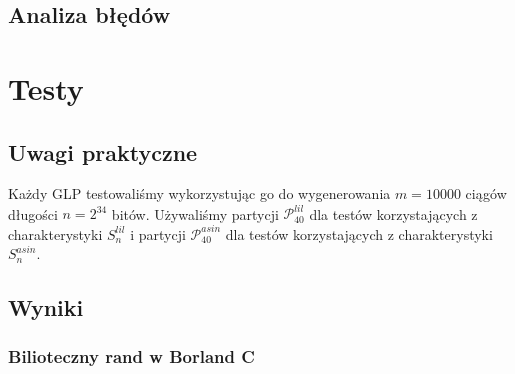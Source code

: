 \documentclass[a4paper,11pt,twoside]{book}
\newcommand{\Slil}[1]{S^{lil}_#1}
\newcommand{\Sasin}[1]{S^{asin}_#1}
\theoremstyle{definition}
\begin{document}
\section{Analiza błędów}


\chapter{Testy}
\label{czesc:testy}

\section{Uwagi praktyczne}

Każdy GLP testowaliśmy wykorzystując go do wygenerowania $m = 10000$ ciągów długości $n = 2^{34}$ bitów. Używaliśmy partycji $\mathcal{P}^{lil}_{40}$ dla testów korzystających z charakterystyki $\Slil{n}$ i partycji $\mathcal{P}^{asin}_{40}$ dla testów korzystających z charakterystyki $\Sasin{n}$.

\section{Wyniki}
% 
%  
%  

\subsection{Bilioteczny rand w Borland C}
\end{document}
